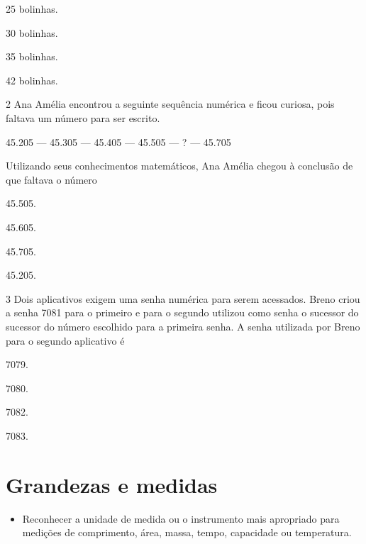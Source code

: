 \begin{mdframed}[linewidth=2pt,linecolor=salmao,roundcorner=2pt]
\begin{escolha}
\item
  25 bolinhas.
\item
  30 bolinhas.
\item
  35 bolinhas.
\item
  42 bolinhas.
\end{escolha}

\num{2} Ana Amélia encontrou a seguinte sequência numérica e ficou curiosa, pois
faltava um número para ser escrito.

\begin{mdframed}[linewidth=2pt,linecolor=azul!20,backgroundcolor=azul!20,roundcorner=2pt]
45.205 --- 45.305 --- 45.405 --- 45.505 --- ? --- 45.705
\end{mdframed}

Utilizando seus conhecimentos matemáticos, Ana Amélia chegou à conclusão de que
faltava o número

\begin{escolha}
\item
  45.505.
\item
  45.605.
\item
  45.705.
\item
  45.205.
\end{escolha}

\num{3} Dois aplicativos exigem uma senha numérica para serem acessados. Breno
criou a senha 7081 para o primeiro e para o segundo utilizou como senha
o sucessor do sucessor do número escolhido para a primeira senha. A
senha utilizada por Breno para o segundo aplicativo é

\begin{escolha}
\item
  7079.
\item
  7080.
\item
  7082.
\item
  7083.
\end{escolha}

\chapter{Grandezas e medidas}


\begin{itemize}
\item Reconhecer a unidade de medida ou o instrumento mais apropriado para
medições de comprimento, área, massa, tempo, capacidade ou temperatura.


\end{itemize}
\end{mdframed}
